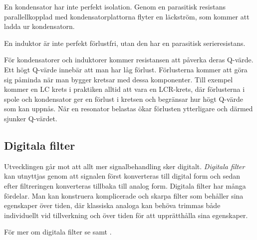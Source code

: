 En kondensator har inte perfekt isolation.
Genom en parasitisk resistans parallellkopplad med kondensatorplattorna flyter
en läckström, som kommer att ladda ur kondensatorn.

En induktor är inte perfekt förlustfri, utan den har en parasitisk serieresistans.

För kondensatorer och induktorer kommer resistansen att påverka deras Q-värde.
Ett högt Q-värde innebär att man har låg förlust.
Förlusterna kommer att göra sig påminda när man bygger kretsar med dessa
komponenter.
Till exempel kommer en LC krets i praktiken alltid att vara en LCR-krets, där
förlusterna i spole och kondensator ger en förlust i kretsen och begränsar hur
högt Q-värde som kan uppnås.
När en resonator belastas ökar förlusten ytterligare och därmed sjunker Q-värdet.


\subsection{Digitala filter}

Utvecklingen går mot att allt mer signalbehandling sker digitalt. 
\emph{Digitala filter} kan utnyttjas genom att signalen först konverteras till
digital form och sedan efter filtreringen konverteras tillbaka till analog form.
Digitala filter har många fördelar.
Man kan konstruera komplicerade och skarpa filter som behåller sina egenskaper
över tiden, där klassiska analoga kan behöva trimmas både individuellt vid
tillverkning och över tiden för att upprätthålla sina egenskaper.

För mer om digitala filter se  samt .
